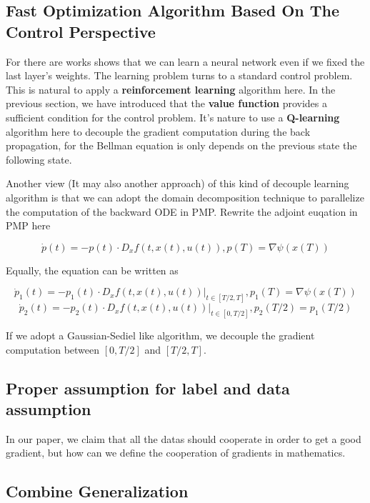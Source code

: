 \documentclass{article}
\theoremstyle{plain}
\theoremstyle{definition}
\begin{document}
\subsection{Fast Optimization Algorithm Based On The Control Perspective}

For there are works shows that we can learn a neural network even if we fixed the last layer's weights. The learning problem turns to a standard control problem. This is natural to apply a \textbf{reinforcement learning} algorithm here. In the previous section, we have introduced that the \textbf{value function} provides a sufficient condition for the control problem. It's nature to use a \textbf{Q-learning} algorithm here to decouple the gradient computation during the back propagation, for the Bellman equation is only depends on the previous state the following state.


Another view (It may also another approach) of this kind of decouple learning algorithm is that we can adopt the domain decomposition technique to parallelize the computation of the backward ODE in PMP. Rewrite the adjoint euqation in PMP here

$$
\dot p(t) = -p(t)\cdot D_xf(t,x(t),u(t)),p(T)=\nabla \psi(x(T))
$$

Equally, the equation can be written as

$$
\dot p_1(t) = -p_1(t)\cdot D_xf(t,x(t),u(t))|_{t\in[T/2,T]},p_1(T)=\nabla \psi(x(T))$$
$$
\dot p_2(t) = -p_2(t)\cdot D_xf(t,x(t),u(t))|_{t\in[0,T/2]},p_2(T/2)=p_1(T/2)
$$

If we adopt a Gaussian-Sediel like algorithm, we decouple the gradient computation between $[0,T/2]$ and $[T/2,T]$.

\subsection{Proper assumption for label and data assumption}

In our paper, we claim that all the datas should cooperate in order to get a good gradient, but how can we define the cooperation of gradients in mathematics.

\subsection{Combine Generalization}




\end{document}
